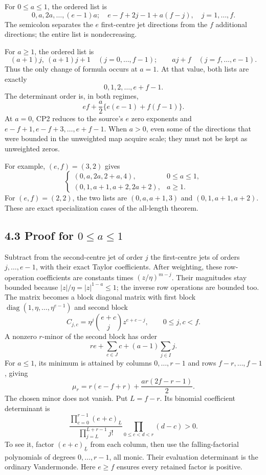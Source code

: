 \documentclass[
  11pt,
]{article}
\begin{document}
For \(0\le a\le1\), the ordered list is \[
\boxed{
0,a,2a,\ldots,(e-1)a;
\quad e-f+2j-1+a(f-j),\quad j=1,\ldots,f.
} \tag{CP2}
\] The semicolon separates the \(e\) first-centre jet directions from
the \(f\) additional directions; the entire list is nondecreasing.

For \(a\ge1\), the ordered list is \[
\boxed{
(a+1)j,\ (a+1)j+1\quad(j=0,\ldots,f-1);
\qquad aj+f\quad(j=f,\ldots,e-1).
} \tag{CP3}
\] Thus the only change of formula occurs at \(a=1\). At that value,
both lists are exactly \[
\boxed{0,1,2,\ldots,e+f-1.} \tag{CP4}
\] The determinant order is, in both regimes, \[
ef+\frac a2\{e(e-1)+f(f-1)\}. \tag{CP5}
\] At \(a=0\), CP2 reduces to the source's \(e\) zero exponents and
\(e-f+1,e-f+3,\ldots,e+f-1\). When \(a>0\), even some of the directions
that were bounded in the unweighted map acquire scale; they must not be
kept as unweighted zeros.

For example, \((e,f)=(3,2)\) gives \[
\begin{cases}
(0,a,2a,2+a,4),&0\le a\le1,\\
(0,1,a+1,a+2,2a+2),&a\ge1.
\end{cases}
\] For \((e,f)=(2,2)\), the two lists are \((0,a,a+1,3)\) and
\((0,1,a+1,a+2)\). These are exact specialization cases of the
all-length theorem.

\subsection{\texorpdfstring{4.3 Proof for
\(0\le a\le1\)}{4.3 Proof for 0\textbackslash le a\textbackslash le1}}\label{proof-for-0le-ale1}

Subtract from the second-centre jet of order \(j\) the first-centre jets
of orders \(j,\ldots,e-1\), with their exact Taylor coefficients. After
weighting, these row-operation coefficients are constants times
\((z/\eta)^{m-j}\). Their magnitudes stay bounded because
\(|z|/\eta=|z|^{1-a}\le1\); the inverse row operations are bounded too.
The matrix becomes a block diagonal matrix with first block
\(\operatorname{diag}(1,\eta,\ldots,\eta^{e-1})\) and second block \[
C_{j,c}=\eta^j\binom{e+c}{j}z^{e+c-j},\qquad 0\le j,c<f.
\tag{CP6}
\] A nonzero \(r\)-minor of the second block has order \[
re+\sum_{c\in J}c+(a-1)\sum_{j\in I}j.
\] For \(a\le1\), its minimum is attained by columns \(0,\ldots,r-1\)
and rows \(f-r,\ldots,f-1\), giving \[
\mu_r=r(e-f+r)+\frac{ar(2f-r-1)}2. \tag{CP7}
\] The chosen minor does not vanish. Put \(L=f-r\). Its binomial
coefficient determinant is \[
\frac{\prod_{c=0}^{r-1}(e+c)_{\underline L}}
{\prod_{j=L}^{L+r-1}j!}
\prod_{0\le c<d<r}(d-c)>0.
\tag{CP8}
\] To see it, factor \((e+c)_{\underline L}\) from each column, then use
the falling-factorial polynomials of degrees \(0,\ldots,r-1\), all
monic. Their evaluation determinant is the ordinary Vandermonde. Here
\(e\ge f\) ensures every retained factor is positive.
\end{document}
